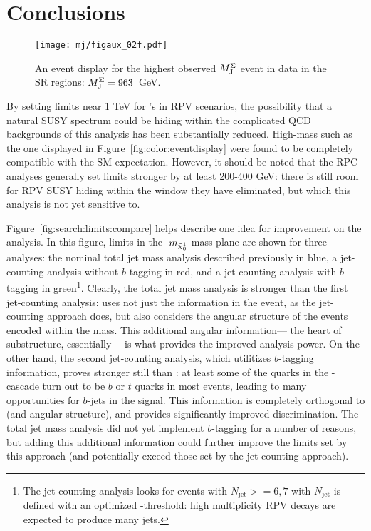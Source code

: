 
\FloatBarrier

\section{Conclusions}



\begin{figure}
\centering
\texttt{[image: mj/figaux\_02f.pdf]}
\caption{An event display for the highest observed $M_{\textrm{J}}^{\Sigma}$ event in data in the SR regions: $M_{\textrm{J}}^{\Sigma} = 963$~GeV.}
\label{fig:search:conclusions:eventdisplay}
\end{figure}


By setting limits near 1 TeV for \gluino's in RPV scenarios, the possibility that a natural SUSY spectrum could be hiding within the complicated QCD backgrounds of this analysis has been substantially reduced. High-mass such as the one displayed in Figure~\ref{fig:color:eventdisplay} were found to be completely compatible with the SM expectation. However, it should be noted that the RPC analyses generally set limits stronger by at least 200-400 GeV: there is still room for RPV SUSY hiding within the window they have eliminated, but which this analysis is not yet sensitive to.

Figure~\ref{fig:search:limits:compare} helps describe one idea for improvement on the analysis. In this figure, limits in the \mgluino-$m_{\tilde{\chi}_0^1}$ mass plane are shown for three analyses: the nominal total jet mass analysis described previously in blue, a jet-counting analysis without $b$-tagging in red, and a jet-counting analysis with $b$-tagging in green\footnote{The jet-counting analysis looks for events with $N_\mathrm{jet}>=6,7$ with $N_\mathrm{jet}$ is defined with an optimized \pt-threshold: high multiplicity RPV \gluino decays are expected to produce many jets.}. Clearly, the total jet mass analysis is stronger than the first jet-counting analysis: \MJ uses not just the \pt information in the event, as the jet-counting approach does, but also considers the angular structure of the events encoded within the mass. This additional angular information--- the heart of substructure, essentially--- is what provides the improved analysis power. On the other hand, the second jet-counting analysis, which utilitizes $b$-tagging information, proves stronger still than \MJ: at least some of the quarks in the \gluino-\lsp cascade turn out to be $b$ or $t$ quarks in most events, leading to many opportunities for $b$-jets in the signal. This information is completely orthogonal to \pt (and angular structure), and provides significantly improved discrimination. The total jet mass analysis did not yet implement $b$-tagging for a number of reasons, but adding this additional information could further improve the limits set by this approach (and potentially exceed those set by the jet-counting approach).


